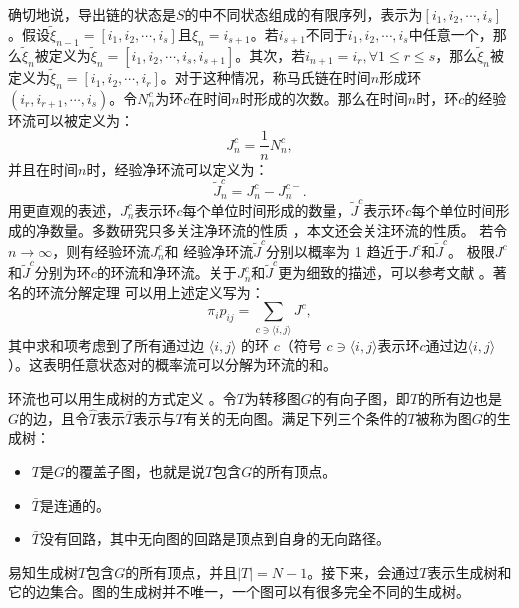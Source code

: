 确切地说，导出链的状态是$S$的中不同状态组成的有限序列，表示为$[i_1,i_2,\cdots,i_s]$。假设$\tilde{\xi}_{n-1}=[i_1,i_2,\cdots,i_s]$且$\xi_n = i_{s+1}$。若$i_{s+1}$不同于$i_1,i_2,\cdots,i_s$中任意一个，那么$\tilde{\xi}_n$被定义为$\tilde{\xi}_n = [i_1,i_2,\cdots,i_s,i_{s+1}]$。其次，若$i_{n+1}=i_r, \forall 1 \le r\le s$，那么$\tilde{\xi}_n$被定义为$\tilde{\xi}_n = [i_1,i_2,\cdots,i_r]$。对于这种情况，称马氏链在时间$n$形成环$(i_r,i_{r+1},\cdots,i_s)$。令$N^c_n$为环$c$在时间$n$时形成的次数。那么在时间$n$时，环$c$的经验环流可以被定义为：
\begin{equation*}
    J_n^c = \frac{1}{n}N^c_n,
\end{equation*}
并且在时间$n$时，经验净环流可以定义为：
\begin{equation*}
    \tilde{J}^c_n = J^c_n-J^{c-}_n.
\end{equation*}
用更直观的表述，$J^c_n$表示环$c$每个单位时间形成的数量，$\tilde{J}^c$表示环$c$每个单位时间形成的净数量。多数研究只多关注净环流的性质 \cite{Schnakenberg1976NetworkTO,andrieux2007fluctuation,andrieux2007network}，本文还会关注环流的性质。
若令$n\rightarrow\infty$，则有经验环流$J^c_n$和 经验净环流$\tilde{J}^c$分别以概率为 1 趋近于$J^c$和$\tilde{J}^c$。
极限$J^c$和$\tilde{J}^c$分别为环$c$的环流和净环流。关于$J^c_n$和$\tilde{J}^c$更为细致的描述，可以参考文献 \cite{jiang2004mathematical}。著名的环流分解定理 \cite{jiang2004mathematical} 可以用上述定义写为：
\begin{equation}\label{decomposition}
    \pi_ip_{ij} = \sum_{c\ni\langle i,j\rangle}J^c,
\end{equation}
其中求和项考虑到了所有通过边 $\langle i, j\rangle$ 的环 $c$（符号 $c \ni \langle i, j\rangle$表示环$c$通过边$\langle i, j\rangle$）。这表明任意状态对的概率流可以分解为环流的和。

环流也可以用生成树的方式定义 \cite{Schnakenberg1976NetworkTO,kalpazidou2007cycle}。令$T$为转移图$G$的有向子图，即$T$的所有边也是$G$的边，且令$\hat{T}$表示$\bar{T}$表示与$T$有关的无向图。满足下列三个条件的$T$被称为图$G$的生成树：
\begin{itemize}
    \item $T$是$G$的覆盖子图，也就是说$T$包含$G$的所有顶点。
    \item $\bar{T}$是连通的。
    \item $\bar{T}$没有回路，其中无向图的回路是顶点到自身的无向路径。
\end{itemize}

易知生成树$T$包含$G$的所有顶点，并且$|T| = N -1$。接下来，会通过$T$表示生成树和它的边集合。图的生成树并不唯一，一个图可以有很多完全不同的生成树。

